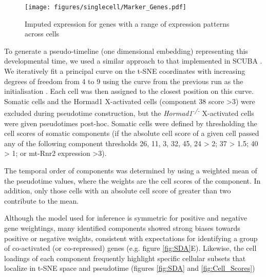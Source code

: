 \begin{figure}[H]
	\centering
	\texttt{[image: figures/singlecell/Marker\_Genes.pdf]}
	\caption[Marker Genes]{Imputed expression for genes with a range of expression patterns across cells}
	\label{fig:Marker_Genes}
\end{figure}

To generate a pseudo-timeline (one dimensional embedding) representing this developmental time, we used a similar approach to that implemented in SCUBA \parencite{Marco2014Bifurcation}. We iteratively fit a principal curve on the t-SNE coordinates with increasing degrees of freedom from 4 to 9 using the curve from the previous run as the initialisation \parencite{Hastie1989Principal}. Each cell was then assigned to the closest position on this curve. Somatic cells and the Hormad1 X-activated cells (component 38 score >3) were excluded during pseudotime construction, but the \textit{Hormad1\textsuperscript{-/-}} X-activated cells were given pseudotimes post-hoc. Somatic cells were defined by thresholding the cell scores of somatic components (if the absolute cell score of a given cell passed any of the following component thresholds 26, 11, 3, 32, 45, 24 > 2; 37 > 1.5; 40 > 1; or mt-Rnr2 expression >3).

The temporal order of components was determined by using a weighted mean of the pseudotime values, where the weights are the cell scores of the component. In addition, only those cells with an absolute cell score of greater than two contribute to the mean.

Although the model used for inference is symmetric for positive and negative gene weightings, many identified components showed strong biases towards positive or negative weights, consistent with expectations for identifying a group of co-activated (or co-repressed) genes (e.g. figure \ref{fig:SDA}E). Likewise, the cell loadings of each component frequently highlight specific cellular subsets that localize in t-SNE space and pseudotime (figures \ref{fig:SDA} and \ref{fig:Cell_Scores})

